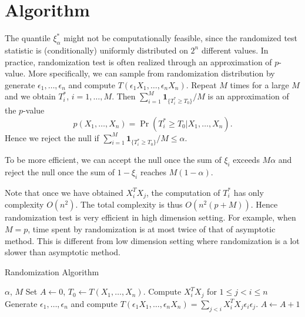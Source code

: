 \documentclass[review]{elsarticle}
\theoremstyle{plain}
\theoremstyle{definition}
\theoremstyle{remark}
\begin{document}
\section{Algorithm}

The quantile $\xi^*_\alpha$ might not be computationally feasible, since the randomized test statistic is (conditionally) uniformly distributed on $2^n$ different values.
In practice, randomization test is often realized through an approximation of $p$-value.
More specifically, we can sample from randomization distribution by generate $\epsilon_1,\ldots,\epsilon_n$ and compute $T(\epsilon_1 X_1,\ldots,\epsilon_n X_n)$.
Repeat $M$ times for a large $M$ and we obtain $T_i^*$, $i=1,\ldots,M$.
Then  $\sum_{i=1}^M \mathbf{1}_{\{T_i^*\geq T_0\}}/M$ is an approximation of the $p$-value 
$$p(X_1,\ldots,X_n)=\Pr(T_i^*\geq T_0|X_1,\ldots,X_n).$$
Hence we reject the null if $\sum_{i=1}^M \mathbf{1}_{\{T_i^*\geq T_0\}}/M\leq \alpha$.

To be more efficient, we can accept the null once the sum of $\xi_i$ exceeds $M\alpha$ and reject the null once the sum of $1-\xi_i$ reaches $M(1-\alpha)$.

Note that once we have obtained $X_i^T X_j$, the computation of $T_i^*$ has only complexity $O(n^2)$.
The total complexity is thus $O(n^2 (p+M))$. Hence randomization test is very efficient in high dimension setting.
For example, when $M=p$, time spent by randomization is at most twice of that of asymptotic method.
This is different from low dimension setting where randomization is a lot slower than asymptotic method.









\begin{algorithm}
    \caption{Randomization Algorithm}
\label{theAlgorithm}
    \begin{algorithmic}
        \REQUIRE  $\alpha$, $M$
        \STATE Set $A\gets 0$, $T_0\gets T(X_1,\ldots,X_n)$.
        \STATE Compute $X_i^T X_j$ for $1\leq j< i\leq n$
            \STATE Generate $\epsilon_1,\ldots,\epsilon_n$ and compute $T(\epsilon_1 X_1,\ldots,\epsilon_n X_n)=\sum_{j<i} X_i^T X_j\epsilon_i\epsilon_j$.
            \STATE $A\gets A+1$
            \ENDIF
            \ENDIF
            \ENDIF
        \ENDFOR
    \end{algorithmic}
\end{algorithm}
\end{document}
